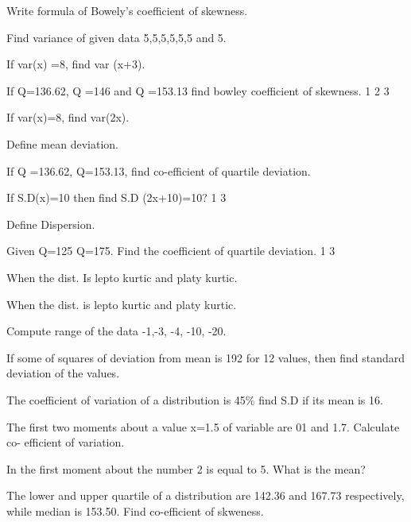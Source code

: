 \documentclass[11pt,a4paper]{article}
\begin{document}
\begin{shortlist}
\item Write formula of Bowely's coefficient of skewness.

\item Find variance of given data 5,5,5,5,5,5 and 5.

\item If var(x) =8, find var (x+3).

\item If Q=136.62, Q =146 and Q =153.13 find bowley coefficient of skewness. 1 2 3

\item If var(x)=8, find var(2x).

\item Define mean deviation.

\item If Q =136.62, Q=153.13, find co-efficient of quartile deviation.

\item If S.D(x)=10 then find S.D (2x+10)=10? 1 3

\item Define Dispersion.

\item Given Q=125 Q=175. Find the coefficient of quartile deviation. 1 3

\item When the dist. Is lepto kurtic and platy kurtic.

\item When the dist. is lepto kurtic and platy kurtic.

\item Compute range of the data -1,-3, -4, -10, -20.

\item If some of squares of deviation from mean is 192 for 12 values, then find standard deviation of the values.

\item The coefficient of variation of a distribution is 45\% find S.D if its mean is 16.

\item The first two moments about a value x=1.5 of variable are 01 and 1.7. Calculate co- efficient of variation.

\item In the first moment about the number 2 is equal to 5. What is the mean?

\item The lower and upper quartile of a distribution are 142.36 and 167.73 respectively, while median is 153.50. Find co-efficient of skweness.


\end{shortlist}
\end{document}
